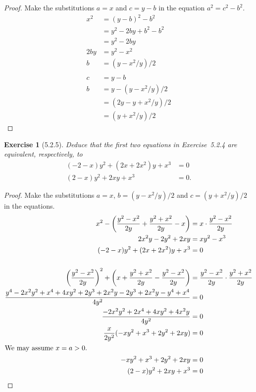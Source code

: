 \documentclass[12pt]{article}
\theoremstyle{plain}
\newtheorem{ex}{Exercise}
\begin{document}
\begin{proof}
  Make the substitutions $a=x$ and $c=y-b$ in the equation $a^2=c^2-b^2$.
  \begin{align*}
    x^2 &= (y-b)^2-b^2 \\
        &= y^2-2by+b^2-b^2 \\
        &= y^2-2by \\
    2by &= y^2-x^2 \\
    b   &= (y-x^2/y)/2 \\
    \\
    c   &= y-b \\
    b   &= y-(y-x^2/y)/2 \\
        &= (2y-y+x^2/y)/2 \\
        &= (y+x^2/y)/2
  \end{align*}
\end{proof}

\begin{ex} [5.2.5]
  Deduce that the first two equations in Exercise~5.2.4 are equivalent, respectively, to
  \begin{align*}
    (-2-x)y^2+(2x+2x^2)y+x^3  &= 0 \\
    (2-x)y^2+2xy+x^3          &= 0.
  \end{align*}
\end{ex}

\begin{proof}
  Make the substitutions $a=x$, $b=(y-x^2/y)/2$ and $c=(y+x^2/y)/2$ in the equations.
  \begin{align*}
    x^2-\left(\frac{y^2-x^2}{2y}+\frac{y^2+x^2}{2y}-x\right)                                &= x\cdot\frac{y^2-x^2}{2y} \\
    2x^2y-2y^2+2xy                                                                          &= xy^2-x^3 \\
    (-2-x)y^2+(2x+2x^2)y+x^3                                                                &= 0 \\
    \\
    \left(\frac{y^2-x^2}{2y}\right)^2+\left(x+\frac{y^2+x^2}{2y}-\frac{y^2-x^2}{2y}\right)  &= \frac{y^2-x^2}{2y}\cdot\frac{y^2+x^2}{2y} \\
    \frac{y^4-2x^2y^2+x^4+4xy^2+2y^3+2x^2y-2y^3+2x^2y-y^4+x^4}{4y^2}                        &= 0 \\
    \frac{-2x^2y^2+2x^4+4xy^2+4x^2y}{4y^2}                                                  &= 0 \\
    \frac{x}{2y^2}(-xy^2+x^3+2y^2+2xy)                                                      &= 0 \\
    \intertext{We may assume $x=a>0$.}
    -xy^2+x^3+2y^2+2xy                                                                      &= 0 \\
    (2-x)y^2+2xy+x^3                                                                        &= 0
  \end{align*}
\end{proof}
\end{document}
